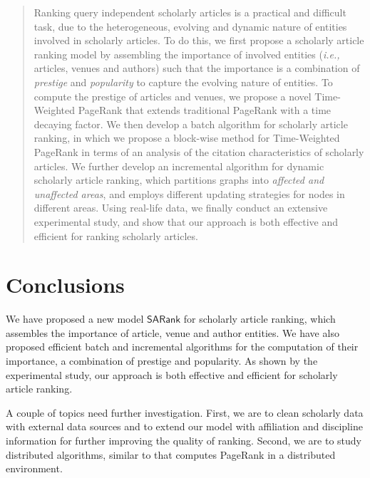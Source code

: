 \documentclass[10pt,conference,letterpaper]{IEEEtran}
\newcounter{prop}
\newcounter{fact}
\newcounter{alg}[section]
\newcommand{\ie}{\emph{i.e.,}\xspace}
\newcommand{\kw}[1]{{\ensuremath {\mathsf{#1}}}\xspace}
\newcommand{\ensemblerank}{\kw{SARank}}
\begin{document}
\begin{abstract}
Ranking query independent scholarly articles is a
practical and difficult task, due to the
heterogeneous, evolving and dynamic nature of entities involved in scholarly articles.
To do this, we first propose a scholarly article ranking model by assembling the importance of involved entities (\ie articles, venues and authors) such that the importance is a combination of {\em prestige} and {\em popularity} to capture the evolving nature of entities.
To compute the prestige of articles and venues, we propose a novel Time-Weighted PageRank that extends traditional PageRank with a time decaying factor. %
We then develop a batch algorithm for scholarly article ranking, in which we propose a block-wise method for Time-Weighted PageRank in terms of an analysis of the citation characteristics of scholarly articles.
We further develop  an incremental algorithm for dynamic scholarly article ranking, which partitions graphs into {\em affected and unaffected areas}, and employs different updating strategies for nodes in different areas. Using real-life data, we finally conduct an extensive experimental study, and show that our approach is both effective and efficient for ranking scholarly articles.
\end{abstract}










\section{Conclusions}
\label{sec-conc}
We have proposed a new model \ensemblerank for scholarly article ranking,
which assembles the importance of article, venue and author entities.
We have also proposed efficient batch and incremental algorithms for the computation of their importance, a combination of prestige and popularity.
As shown by the experimental study, our approach is both effective and efficient for scholarly article ranking.


A couple of topics need further investigation. First, we are to clean scholarly data with external data sources
and to extend our model with affiliation and discipline information for further improving the quality of ranking.
Second, we are to study distributed algorithms, similar to \cite{ZhuYL05} that computes PageRank in a distributed environment.
\end{document}
